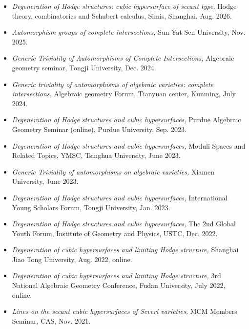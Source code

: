 \documentclass[letterpaper]{article}
\begin{document}
\begin{itemize}
  
  \item \textit{Degeneration of Hodge structures: cubic hypersurface of secant type,}
  Hodge theory, combinatorics and Schubert calculus, Simis, Shanghai, Aug. 2026.

  \item \textit{Automorphism groups of complete intersections,}
  Sun Yat-Sen University, Nov. 2025.

  \item \textit{Generic Triviality of Automorphisms of Complete Intersections,} 
  Algebraic geometry seminar, Tongji University, Dec. 2024.

  \item \textit{Generic triviality of automorphisms of algebraic varieties: complete intersections,}
  Algebraic geometry Forum, Tianyuan center, Kunming, July 2024.
 
  \item \textit{Degeneration of Hodge structures and cubic hypersurfaces,}
  Purdue Algebraic Geometry Seminar (online), Purdue University, Sep. 2023.

  \item \textit{Degeneration of Hodge structures and cubic hypersurfaces,}
  Moduli Spaces and Related Topics, YMSC, Tsinghua University, June 2023.

  \item \textit{Generic Triviality of automorphisms on algebraic varieties,}
  Xiamen University, June 2023.

  \item \textit{Degeneration of Hodge structures and cubic hypersurfaces,}
  International Young Scholars Forum, Tongji University, Jan. 2023.

  \item \textit{Degeneration of Hodge structures and cubic hypersurfaces,}
  The 2nd Global Youth Forum, Institute of Geometry and Physics, USTC, Dec. 2022.

  \item \textit{Degeneration of cubic hypersurfaces and limiting Hodge structure,}
  Shanghai Jiao Tong University, Aug. 2022, online.

  \item \textit{Degeneration of cubic hypersurfaces and limiting Hodge structure,}
  3rd National Algebraic Geometry Conference, Fudan University, July 2022, online.

  \item \textit{Lines on the secant cubic hypersurfaces of Severi varieties,}
  MCM Members Seminar, CAS, Nov. 2021.


\end{itemize}
\end{document}
